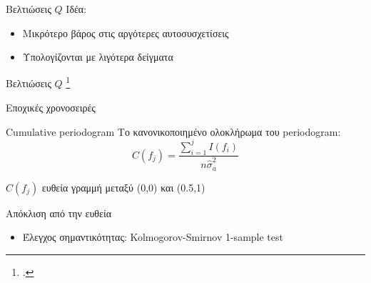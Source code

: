 \documentclass[11pt,center,lualatex]{beamer}
\begin{document}
\begin{frame}{Βελτιώσεις $Q$}
  Ιδέα:
  \begin{itemize}
    \item Mικρότερο βάρος στις αργότερες αυτοσυσχετίσεις
    \item Υπολογίζονται με λιγότερα δείγματα
  \end{itemize}

\end{frame}

\begin{frame}{Βελτιώσεις $Q$}
  \footcite{monti1994}
\end{frame}


\begin{frame}{Εποχικές χρονοσειρές}

  \pause

  \pause \pause
  \begin{block}{Cumulative periodogram}
    Το κανονικοποιημένο ολοκλήρωμα του periodogram:
    $$ C(f_j) = \frac {\sum^j_{i=1} I(f_i)} {n \hat{\sigma}_a^2} $$
  \end{block}

  \pause
  \begin{description}
	\item[Λευκός θόρυβος] $C(f_j)$ ευθεία γραμμή μεταξύ (0,0) και (0.5,1)
	\item[Περιοδικότητα] Απόκλιση από την ευθεία
	\begin{itemize}
	  \item Έλεγχος σημαντικότητας: Kolmogorov-Smirnov 1-sample test
	\end{itemize}
  \end{description}
\end{frame}

\nocite{*}
\begin{frame}
  \printbibliography
\end{frame}
\end{document}
